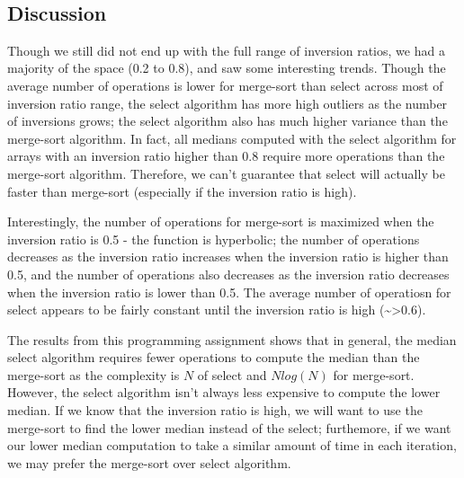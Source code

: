 \documentclass[11pt]{article}
\begin{document}
    \begin{center}
    \end{center}
    { \hspace*{\fill} \\}
    
    \subsection{Discussion}\label{discussion}

Though we still did not end up with the full range of inversion ratios,
we had a majority of the space (0.2 to 0.8), and saw some interesting
trends. Though the average number of operations is lower for merge-sort
than select across most of inversion ratio range, the select algorithm
has more high outliers as the number of inversions grows; the select
algorithm also has much higher variance than the merge-sort algorithm.
In fact, all medians computed with the select algorithm for arrays with
an inversion ratio higher than 0.8 require more operations than the
merge-sort algorithm. Therefore, we can't guarantee that select will
actually be faster than merge-sort (especially if the inversion ratio is
high).

Interestingly, the number of operations for merge-sort is maximized when
the inversion ratio is 0.5 - the function is hyperbolic; the number of
operations decreases as the inversion ratio increases when the inversion
ratio is higher than 0.5, and the number of operations also decreases as
the inversion ratio decreases when the inversion ratio is lower than
0.5. The average number of operatiosn for select appears to be fairly
constant until the inversion ratio is high
(\textasciitilde{}\textgreater{}0.6).

The results from this programming assignment shows that in general, the
median select algorithm requires fewer operations to compute the median
than the merge-sort as the complexity is \(N\) of select and \(Nlog(N)\)
for merge-sort. However, the select algorithm isn't always less
expensive to compute the lower median. If we know that the inversion
ratio is high, we will want to use the merge-sort to find the lower
median instead of the select; furthemore, if we want our lower median
computation to take a similar amount of time in each iteration, we may
prefer the merge-sort over select algorithm.


    
    
    
    
\end{document}
